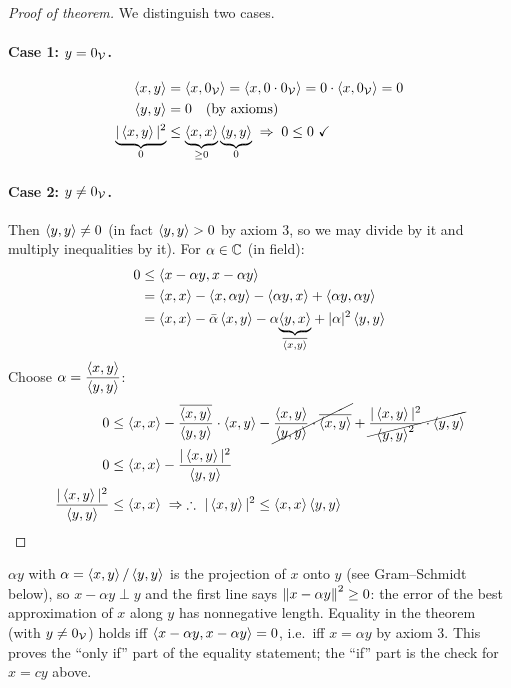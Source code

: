 \begin{proof}[Proof of theorem]
We distinguish two cases.
\paragraph{Case 1: $y = 0_{\mathcal{V}}$.}
\begin{align*}
\left\langle x, y \right\rangle &= \left\langle x, 0_{\mathcal{V}} \right\rangle = \left\langle x, 0\cdot 0_{\mathcal{V}} \right\rangle = 0\cdot\left\langle x, 0_{\mathcal{V}} \right\rangle = 0\\
\left\langle y, y \right\rangle &= 0 \quad \text{(by axioms)}\\
\underbrace{|\left\langle x, y \right\rangle|^2}_{0} &\le \underbrace{\left\langle x, x \right\rangle}_{\ge 0}\underbrace{\left\langle y, y \right\rangle}_{0} \;\Rightarrow\; 0\le 0 \ \checkmark
\end{align*}
\paragraph{Case 2: $y\neq 0_{\mathcal{V}}$.} Then $\left\langle y, y \right\rangle\neq 0$ (in fact $\left\langle y, y \right\rangle>0$ by axiom 3, so we may divide by it and multiply inequalities by it).
For $\alpha\in\mathbb{C}$ (in field):
\begin{align*}
0 &\le \left\langle x-\alpha y, x-\alpha y \right\rangle\\
&= \left\langle x, x \right\rangle - \left\langle x, \alpha y \right\rangle - \left\langle \alpha y, x \right\rangle + \left\langle \alpha y, \alpha y \right\rangle\\
&= \left\langle x, x \right\rangle - \bar\alpha\left\langle x, y \right\rangle - \alpha{\underbrace{\left\langle y, x \right\rangle}_{\overline{\left\langle x, y \right\rangle}}} + |\alpha|^2\left\langle y, y \right\rangle
\end{align*}
Choose $\displaystyle \alpha = \frac{\left\langle x, y \right\rangle}{\left\langle y, y \right\rangle}$:
\begin{align*}
0 &\le \left\langle x, x \right\rangle - \frac{\overline{\left\langle x, y \right\rangle}}{\left\langle y, y \right\rangle}\cdot\left\langle x, y \right\rangle - \cancel{\frac{\left\langle x, y \right\rangle}{\left\langle y, y \right\rangle}\cdot\overline{\left\langle x, y \right\rangle}} + \cancel{\frac{|\left\langle x, y \right\rangle|^2}{\left\langle y, y \right\rangle^2}\cdot\left\langle y, y \right\rangle}\\
0 &\le \left\langle x, x \right\rangle - \frac{|\left\langle x, y \right\rangle|^2}{\left\langle y, y \right\rangle}\\
\frac{|\left\langle x, y \right\rangle|^2}{\left\langle y, y \right\rangle} &\le \left\langle x, x \right\rangle \;\Rightarrow\; \therefore\ |\left\langle x, y \right\rangle|^2 \le \left\langle x, x \right\rangle\left\langle y, y \right\rangle
\qedhere
\end{align*}
\end{proof}
\begin{insight}
$\alpha y$ with $\alpha = \left\langle x, y \right\rangle/\left\langle y, y \right\rangle$ is the projection of $x$ onto $y$ (see Gram--Schmidt below), so $x-\alpha y\perp y$ and the first line says $\left\lVert x-\alpha y \right\rVert^2\ge 0$: the error of the best approximation of $x$ along $y$ has nonnegative length.
Equality in the theorem (with $y\neq 0_{\mathcal{V}}$) holds iff $\left\langle x-\alpha y, x-\alpha y \right\rangle = 0$, i.e.\ iff $x = \alpha y$ by axiom 3. This proves the ``only if'' part of the equality statement; the ``if'' part is the check for $x = cy$ above.
\end{insight}

